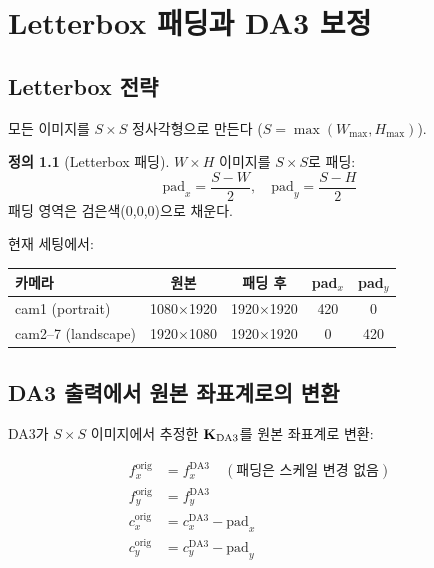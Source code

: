 \documentclass[11pt, a4paper]{report}
\theoremstyle{definition}
\newtheorem{definition}{정의}[chapter]
\theoremstyle{remark}
\begin{document}
\chapter{Letterbox 패딩과 DA3 보정}
\label{ch:letterbox}

\section{Letterbox 전략}

모든 이미지를 $S \times S$ 정사각형으로 만든다 ($S = \max(W_{\max}, H_{\max})$).

\begin{definition}[Letterbox 패딩]
$W \times H$ 이미지를 $S \times S$로 패딩:
\begin{equation}
\text{pad}_x = \frac{S - W}{2}, \quad \text{pad}_y = \frac{S - H}{2}
\end{equation}
패딩 영역은 검은색(0,0,0)으로 채운다.
\end{definition}

현재 세팅에서:
\begin{table}[H]
\centering
\renewcommand{\arraystretch}{1.3}
\begin{tabular}{lcccc}
\toprule
\textbf{카메라} & \textbf{원본} & \textbf{패딩 후} & \textbf{pad$_x$} & \textbf{pad$_y$} \\
\midrule
cam1 (portrait) & 1080$\times$1920 & 1920$\times$1920 & 420 & 0 \\
cam2--7 (landscape) & 1920$\times$1080 & 1920$\times$1920 & 0 & 420 \\
\bottomrule
\end{tabular}
\end{table}


\section{DA3 출력에서 원본 좌표계로의 변환}

DA3가 $S \times S$ 이미지에서 추정한 $\mathbf{K}_{\text{DA3}}$를 원본 좌표계로 변환:

\begin{equation}
\boxed{
\begin{aligned}
f_x^{\text{orig}} &= f_x^{\text{DA3}} \quad (\text{패딩은 스케일 변경 없음}) \\
f_y^{\text{orig}} &= f_y^{\text{DA3}} \\
c_x^{\text{orig}} &= c_x^{\text{DA3}} - \text{pad}_x \\
c_y^{\text{orig}} &= c_y^{\text{DA3}} - \text{pad}_y
\end{aligned}
}
\label{eq:letterbox_to_orig}
\end{equation}
\end{document}

